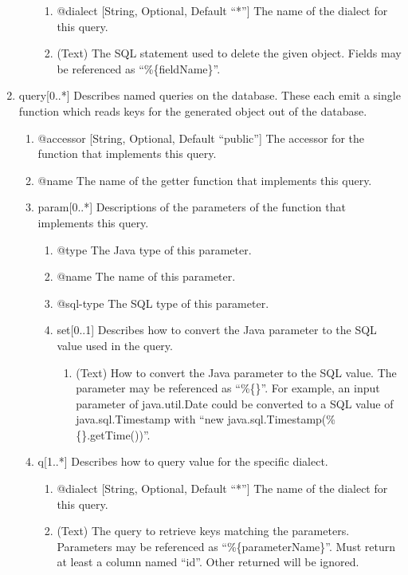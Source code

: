 \documentclass{book}
\begin{document}
\begin{enumerate}
\begin{enumerate}
        \begin{enumerate}
            \item @dialect [String, Optional, Default ``*''] The name of the
              dialect for this query.
            \item (Text) The SQL statement used to delete the given object.
                  Fields may be referenced as ``\%\{fieldName\}''.
        \end{enumerate}
    \end{enumerate}
    \item query[0..*] Describes named queries on the database. These each emit
          a single function which reads keys for the generated object out of
          the database.
    \begin{enumerate}
        \item @accessor [String, Optional, Default ``public''] The accessor for
              the function that implements this query.
        \item @name The name of the getter function that implements this query.
        \item param[0..*] Descriptions of the parameters of the function that
              implements this query.
        \begin{enumerate}
            \item @type The Java type of this parameter.
            \item @name The name of this parameter.
            \item @sql-type The SQL type of this parameter.
            \item set[0..1] Describes how to convert the Java parameter to the
                  SQL value used in the query.
            \begin{enumerate}
                \item (Text) How to convert the Java parameter to the SQL value.
                      The parameter may be referenced as ``\%\{\}''. For
                      example, an input parameter of java.util.Date could be
                      converted to a SQL value of java.sql.Timestamp with
                      ``new java.sql.Timestamp(\%\{\}.getTime())''.
            \end{enumerate}
        \end{enumerate}
        \item q[1..*] Describes how to query value for the specific dialect.
        \begin{enumerate}
            \item @dialect [String, Optional, Default ``*''] The name of the
                  dialect for this query.
            \item (Text) The query to retrieve keys matching the parameters.
                  Parameters may be referenced as ``\%\{parameterName\}''. Must
                  return at least a column named ``id''. Other returned will be
                  ignored.
        \end{enumerate}
    \end{enumerate}
\end{enumerate}
\end{document}
